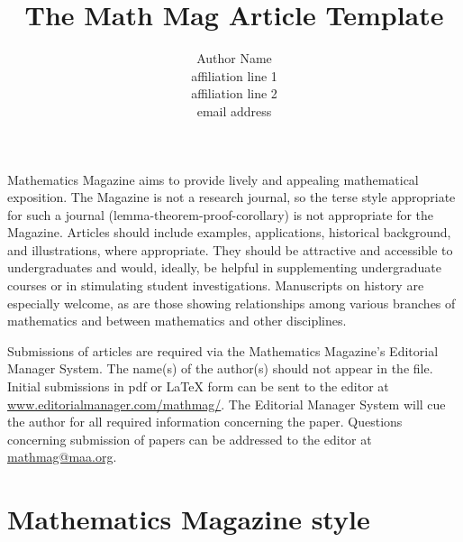 \documentclass{article}
\theoremstyle{theorem}
\theoremstyle{definition}
\begin{document}
    \title{The Math Mag Article Template}

    \author{Author Name\\               %
        \scriptsize affiliation line 1\\    %
        affiliation line 2\\                %
        email address}                      %

    \maketitle

    \noindent  Mathematics Magazine aims to provide lively and appealing mathematical exposition. The Magazine is not a research journal, so the terse style appropriate for such a journal (lemma-theorem-proof-corollary) is not appropriate for the Magazine. Articles should include examples, applications, historical background, and illustrations, where appropriate. They should be attractive and accessible to undergraduates and would, ideally, be helpful in supplementing undergraduate courses or in stimulating student investigations. Manuscripts on history are especially welcome, as are those showing relationships among various branches of mathematics and between mathematics and other disciplines.

    Submissions of articles are required via the Mathematics Magazine's Editorial Manager System. The name(s) of the author(s) should not appear in the file. Initial submissions in pdf or LaTeX form can be sent to the editor at \href{http://www.editorialmanager.com/mathmag/}{\url{www.editorialmanager.com/mathmag/}}.
    The Editorial Manager System will cue the author for all required information concerning the paper. Questions concerning submission of papers can be addressed to the editor at \href{mathmag@maa.org}{\url{mathmag@maa.org}}.

    \section{Mathematics Magazine style}
\end{document}
